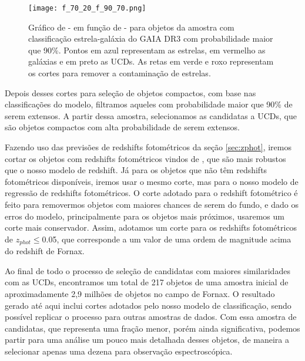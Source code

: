 \begin{figure}[!ht]
    \begin{center}
    \texttt{[image: f\_70\_20\_f\_90\_70.png]}
    \caption[]{Gráfico de  -  em função de  -  para objetos da amostra com classificação estrela-galáxia do GAIA DR3 com probabilidade maior que 90\%. Pontos em azul representam as estrelas, em vermelho as galáxias e em preto as UCDs. As retas em verde e roxo representam os cortes para remover a contaminação de estrelas.}
    \label{flux_radius_3}
    \end{center}
\end{figure}

Depois desses cortes para seleção de objetos compactos, com base nas classificações do modelo, filtramos aqueles com probabilidade maior que 90\% de serem extensos. A partir dessa amostra, selecionamos as candidatas a UCDs, que são objetos compactos com alta probabilidade de serem extensos.

Fazendo uso das previsões de redshifts fotométricos da seção \ref{sec:zphot}, iremos cortar os objetos com redshifts fotométricos vindos de \citep{erik_photoz_2024}, que são mais robustos que o nosso modelo de redshift. Já para os objetos que não têm redshifts fotométricos disponíveis, iremos usar o mesmo corte, mas para o nosso modelo de regressão de redshifts fotométricos. O corte adotado para o redshift fotométrico é feito para removermos objetos com maiores chances de serem do fundo, e dado os erros do modelo, principalmente para os objetos mais próximos, usaremos um corte mais conservador. Assim, adotamos um corte para os redshifts fotométricos de \textit{$z_{phot}$}$\leq$0.05, que corresponde a um valor de uma ordem de magnitude acima do redshift de Fornax.

Ao final de todo o processo de seleção de candidatas com maiores similaridades com as UCDs, encontramos um total de 217 objetos de uma amostra inicial de aproximadamente 2,9 milhões de objetos no campo de Fornax. O resultado gerado até aqui inclui cortes adotados pelo nosso modelo de classificação, sendo possível replicar o processo para outras amostras de dados. Com essa amostra de candidatas, que representa uma fração menor, porém ainda significativa, podemos partir para uma análise um pouco mais detalhada desses objetos, de maneira a selecionar apenas uma dezena para observação espectroscópica.

